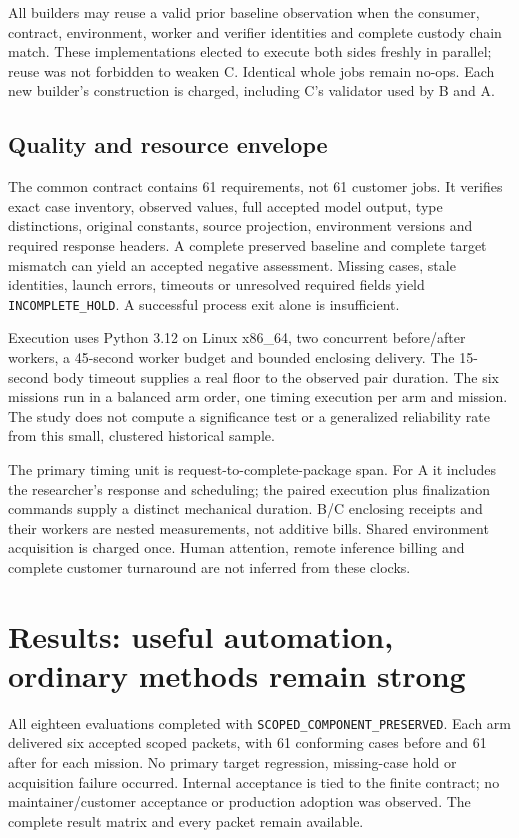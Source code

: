 \documentclass[11pt,a4paper]{article}
\newcommand{\Preserved}{\texttt{SCOPED\_COMPONENT\_PRESERVED}}
\newcommand{\Hold}{\texttt{INCOMPLETE\_HOLD}}
\begin{document}
All builders may reuse a valid prior baseline observation when the consumer, contract, environment, worker and verifier identities and complete custody chain match. These implementations elected to execute both sides freshly in parallel; reuse was not forbidden to weaken C. Identical whole jobs remain no-ops. Each new builder's construction is charged, including C's validator used by B and A.\cite{protocol,incumbent}

\subsection{Quality and resource envelope}

The common contract contains 61 requirements, not 61 customer jobs. It verifies exact case inventory, observed values, full accepted model output, type distinctions, original constants, source projection, environment versions and required response headers. A complete preserved baseline and complete target mismatch can yield an accepted negative assessment. Missing cases, stale identities, launch errors, timeouts or unresolved required fields yield \Hold{}. A successful process exit alone is insufficient.\cite{contract}

Execution uses Python 3.12 on Linux x86\_64, two concurrent before/after workers, a 45-second worker budget and bounded enclosing delivery. The 15-second body timeout supplies a real floor to the observed pair duration. The six missions run in a balanced arm order, one timing execution per arm and mission. The study does not compute a significance test or a generalized reliability rate from this small, clustered historical sample.\cite{protocol}

The primary timing unit is request-to-complete-package span. For A it includes the researcher's response and scheduling; the paired execution plus finalization commands supply a distinct mechanical duration. B/C enclosing receipts and their workers are nested measurements, not additive bills. Shared environment acquisition is charged once. Human attention, remote inference billing and complete customer turnaround are not inferred from these clocks.\cite{economics}

\section{Results: useful automation, ordinary methods remain strong}
\label{sec:results}

All eighteen evaluations completed with \Preserved{}. Each arm delivered six accepted scoped packets, with 61 conforming cases before and 61 after for each mission. No primary target regression, missing-case hold or acquisition failure occurred. Internal acceptance is tied to the finite contract; no maintainer/customer acceptance or production adoption was observed. The complete result matrix and every packet remain available.\cite{results,productreview}
\end{document}
